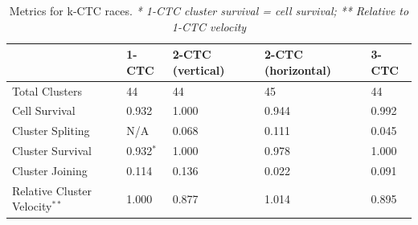 \documentclass[12pt]{article}
\begin{document}
\begin{table}[h]
    \begin{tabular}{|l|l|l|l|l|}
    \hline
    ~                & 1-CTC   & 2-CTC (vertical) & 2-CTC (horizontal) & 3-CTC  \\ \hline
    Total Clusters     & 44      & 44               & 45                 & 44     \\ \hline
    Cell Survival    & 0.932  & 1.000          & 0.944             & 0.992 \\ \hline
    Cluster Spliting & N/A     & 0.068            & 0.111             & 0.045  \\ \hline
    Cluster Survival & 0.932$^*$ & 1.000            & 0.978             & 1.000  \\ \hline
    Cluster Joining  & 0.114  & 0.136           & 0.022              & 0.091  \\ \hline
    Relative Cluster Velocity$^{**}$ & 1.000       & 0.877      & 1.014     & 0.895      \\ \hline
    \end{tabular}
    \caption{Metrics for k-CTC races.
    \emph{* 1-CTC cluster survival = cell survival;}
    \emph{** Relative to 1-CTC velocity}}
    \label{racestats}
\end{table}
\end{document}
